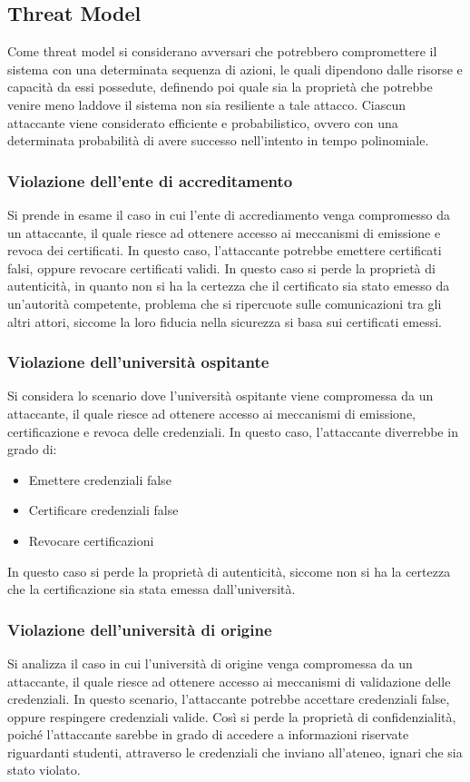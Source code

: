 \documentclass[a4paper,12pt]{article}
\begin{document}
\subsection{Threat Model}
Come threat model si considerano avversari che potrebbero compromettere il sistema con una determinata sequenza di azioni, le quali dipendono dalle risorse e capacità da essi possedute, definendo poi quale sia la proprietà che potrebbe venire meno laddove il sistema non sia resiliente a tale attacco.
\newline Ciascun attaccante viene considerato efficiente e probabilistico, ovvero con una determinata probabilità di avere successo nell'intento in tempo polinomiale.
\subsubsection{Violazione dell'ente di accreditamento}
Si prende in esame il caso in cui l'ente di accrediamento venga compromesso da un attaccante, il quale riesce ad ottenere accesso ai meccanismi di emissione e revoca dei certificati. In questo caso, l'attaccante potrebbe emettere certificati falsi, oppure revocare certificati validi.
\newline In questo caso si perde la proprietà di autenticità, in quanto non si ha la certezza che il certificato sia stato emesso da un'autorità competente, problema che si ripercuote sulle comunicazioni tra gli altri attori, siccome la loro fiducia nella sicurezza si basa sui certificati emessi.
\subsubsection{Violazione dell'università ospitante}
Si considera lo scenario dove l'università ospitante viene compromessa da un attaccante, il quale riesce ad ottenere accesso ai meccanismi di emissione, certificazione e revoca delle credenziali. In questo caso, l'attaccante diverrebbe in grado di:
\begin{itemize}
    \item Emettere credenziali false
    \item Certificare credenziali false
    \item Revocare certificazioni
\end{itemize}
In questo caso si perde la proprietà di autenticità, siccome non si ha la certezza che la certificazione sia stata emessa dall'università.
\subsubsection{Violazione dell'università di origine}
Si analizza il caso in cui l'università di origine venga compromessa da un attaccante, il quale riesce ad ottenere accesso ai meccanismi di validazione delle credenziali. In questo scenario, l'attaccante potrebbe accettare credenziali false, oppure respingere credenziali valide.
\newline Così si perde la proprietà di confidenzialità, poiché l'attaccante sarebbe in grado di accedere a informazioni riservate riguardanti studenti, attraverso le credenziali che inviano all'ateneo, ignari che sia stato violato.
\end{document}
